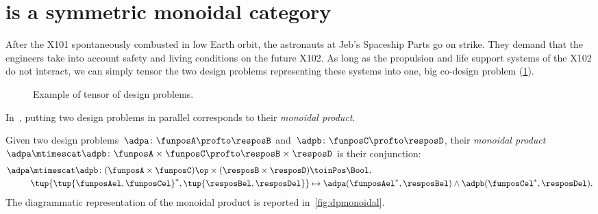 

\section{\DP is a symmetric monoidal category}\label{sec:parallelism-DP-monoidal}


\begin{example}
    After the X101 spontaneously combusted in low Earth orbit, the astronauts at Jeb's Spaceship Parts go on strike.
    They demand that the engineers take into account safety and living conditions on the future X102. As long as the propulsion and life support systems of the X102 do not interact, we can simply tensor the two design problems representing these systems into one, big co-design problem (\cref{fig:examplemonoidal}).
    \begin{figure}[h!]
        \centering
        \caption{Example of tensor of design problems. }
        \label{fig:examplemonoidal}
    \end{figure}
\end{example}
In~\DP, putting two design problems in parallel corresponds to their \emph{monoidal product}.

\begin{definition}
    \label{def:monoidalproduct}
    Given two design problems~$\adpa \colon \funposA \profto \resposB$ and~$\adpb \colon \funposC \profto \resposD$, their \emph{monoidal product}~$\adpa \mtimescat \adpb \colon \funposA \times \funposC \profto \resposB\times \resposD$ is their conjunction:
    \begin{equation}
        \label{eq:monoidalprod_dp}
        \begin{aligned}
            \adpa \mtimescat \adpb \colon (\funposA \times \funposC)\op \times (\resposB \times \resposD) & \toinPos \Bool, \\
            \tup{\tup{\funposAel,\funposCel}^*,\tup{\resposBel,\resposDel}} &\mapsto \adpa(\funposAel^*,\resposBel) \wedge \adpb(\funposCel^*,\resposDel).
        \end{aligned}
    \end{equation}
    The diagrammatic representation of the monoidal product is reported in~\cref{fig:dpmonoidal}.
\end{definition}

